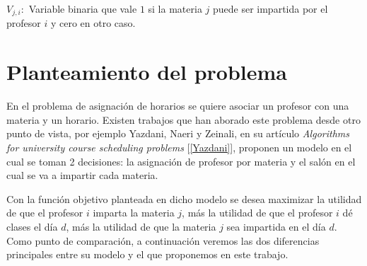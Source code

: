 $V_{j,i}:$ Variable binaria que vale $1$ si la materia $j$ puede ser impartida por  el profesor $i$ y cero en otro caso.


%



  
%
%

  
  
  \section{Planteamiento del problema}

En el problema de asignación de horarios se quiere asociar un profesor con una materia y un horario. Existen trabajos que han aborado este problema desde otro punto de vista, por ejemplo Yazdani, Naeri y Zeinali, en su artículo \textit{Algorithms for university course scheduling problems} [\ref{Yazdani}], proponen un modelo en el cual se toman 2 decisiones: la asignación de profesor por materia y el salón en el cual se va a impartir cada materia.

Con la función objetivo planteada en dicho modelo se desea maximizar la utilidad de que el profesor $i$ imparta la materia $j$, más la utilidad de que el profesor $i$ dé clases el día $d$, más la utilidad de que la materia $j$ sea impartida en el día $d$. Como punto de comparación, a continuación veremos las dos diferencias principales entre su modelo y el que proponemos en este trabajo.

